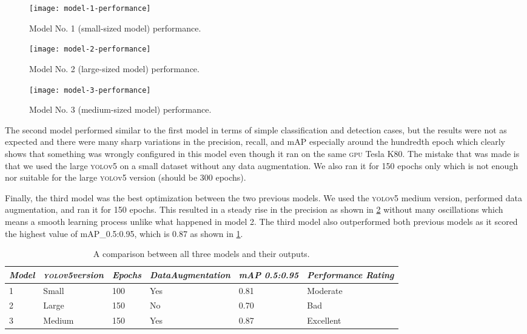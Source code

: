 \documentclass[../main.tex]{subfiles}
\begin{document}
\begin{figure}[tbp] 
	\centering
	\texttt{[image: model-1-performance]} 
        \caption{Model No. 1 (small-sized model) performance.} \label{fig:model-1-performance} 
\end{figure}

\begin{figure}[tbp] 
	\centering
	\texttt{[image: model-2-performance]} 
        \caption{Model No. 2 (large-sized model) performance.} \label{fig:model-2-performance} 
\end{figure}

\begin{figure}[tbp] 
	\centering
	\texttt{[image: model-3-performance]} 
        \caption{Model No. 3 (medium-sized model) performance.} \label{fig:model-3-performance} 
\end{figure}

The second model performed similar to the first model in terms of simple 
classification and detection cases, but the results were not as expected and there 
were many sharp variations in the precision, recall, and mAP especially around the 
hundredth epoch which clearly shows that something was wrongly configured in this model
even though it ran on the same \textsc{gpu} Tesla K80.
The mistake that was made is that we used the large \textsc{yolo}v5 on a small dataset
without any data augmentation. We also ran it for 150 epochs only which is not enough nor 
suitable for the large \textsc{yolo}v5 version (should be 300 epochs).

Finally, the third model was the best optimization between the two previous models. 
We used the \textsc{yolo}v5 medium version, performed data augmentation, and ran it for
150 epochs. This resulted in a steady rise in the precision as shown in 
\cref{fig:model-2-performance} without many oscillations which means a smooth learning
process unlike what happened in model 2. 
The third model also outperformed both previous models as it scored the highest value 
of mAP\_0.5:0.95, which is 0.87 as shown in \cref{tab:model-comparison}. 

\begin{table}[tbp]
	\begin{center}
		\caption{A comparison between all three models and their outputs.}
		\label{tab:model-comparison}
                \begin{tabularx}{\textwidth}
                    {p{1.3cm} X X X X X} 
			\toprule
			\textit{Model} & \textit{\textsc{yolo}v5\newline version} & \textit{Epochs} & 
			\textit{Data\newline Augmentation} & \textit{mAP 0.5:0.95} & \textit{Performance Rating}\\
			\midrule
			 1 & Small & 100 & Yes & 0.81 & Moderate \\
			 2 & Large & 150 & No  & 0.70 & Bad \\
			 3 & Medium& 150 & Yes & 0.87 & Excellent \\		
			\bottomrule
		\end{tabularx}
	\end{center}
\end{table}
\end{document}
